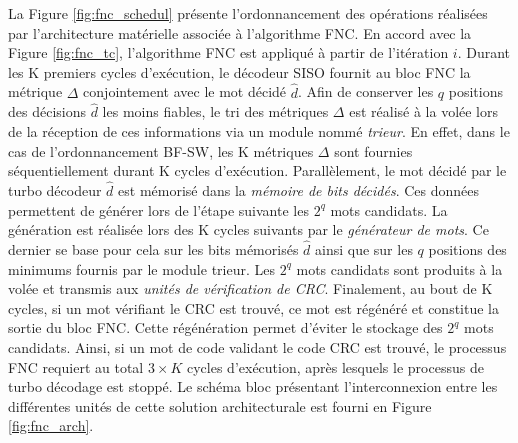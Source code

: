 La Figure \ref{fig:fnc_schedul} présente l'ordonnancement des opérations 
réalisées par l'architecture matérielle associée à l'algorithme FNC.
En accord avec la Figure \ref{fig:fnc_tc}, l'algorithme FNC est appliqué à partir de l'itération $i$. Durant les K 
premiers cycles d'exécution, le 
décodeur SISO fournit au bloc FNC la métrique $\Delta$ conjointement avec le mot décidé $\hat{d}$. 
Afin de conserver les $q$ positions des décisions $\hat{d}$ les moins fiables, le tri des métriques $\Delta$ est réalisé 
à la volée lors de la réception de ces informations via un module nommé \textit{trieur}. En effet, dans le cas de 
l’ordonnancement BF-SW, les K métriques $\Delta$ sont fournies séquentiellement durant K cycles d'exécution. Parallèlement, 
le mot décidé par le turbo décodeur $\hat{d}$ est mémorisé dans la \textit{mémoire de bits décidés}. Ces données permettent de générer lors de 
l'étape suivante les $2^q$ mots candidats. La génération est réalisée lors des K cycles suivants par le 
\textit{générateur de mots}. Ce dernier se base pour cela sur les bits mémorisés $\hat{d}$ ainsi que sur les $q$ positions
des minimums fournis par le module trieur.
Les 
$2^q$ mots candidats sont produits à la volée et transmis aux \textit{unités de vérification de CRC}. Finalement, au 
bout de K cycles, si un mot 
vérifiant le CRC est trouvé, ce mot est régénéré et constitue la sortie du bloc FNC. Cette régénération permet d'éviter 
le stockage des $2^q$ mots candidats. Ainsi, si un mot de code validant le
code CRC est trouvé, le processus FNC requiert au total $3\times K$ cycles d'exécution, après lesquels le processus de 
turbo décodage est stoppé. Le schéma bloc présentant l'interconnexion entre les 
différentes unités de cette solution architecturale est fourni en Figure \ref{fig:fnc_arch}. 

